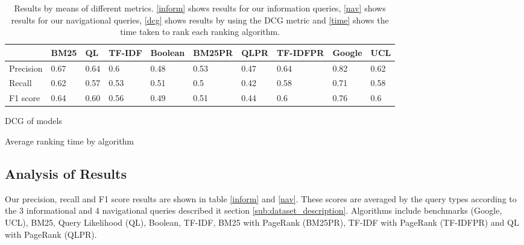 \begin{table*}[!t]
\begin{subtable}{.5\textwidth}
    \label{nav}
    \resizebox{\columnwidth}{!}
    {
      \begin{tabular}{|l|l|l|l|l|l|l|l|l|l|}
      \hline
                & BM25  & QL & TF-IDF &Boolean& BM25PR &QLPR&TF-IDFPR &Google&UCL \\ \hline
      Precision & 0.67& 0.64& 0.6 &0.48& 0.53 & 0.47 & 0.64&0.82&0.62 \\ \hline
      Recall    & 0.62& 0.57& 0.53& 0.51&0.5& 0.42& 0.58 &0.71&0.58\\ \hline
      F1 score  & 0.64& 0.60& 0.56& 0.49& 0.51&0.44 & 0.6&0.76&0.6\\ \hline
      \end{tabular}
    }
    \end{subtable}
    \begin{subtable}{.5\textwidth}
    \centering
    \caption{DCG of models}
    \label{dcg}
    \end{subtable}%
    \begin{subtable}{.5\textwidth}
    \centering
    \caption{Average ranking time by algorithm}
    \end{subtable}
    \caption{Results by means of different metrics. \ref{inform} shows results for our information queries, \ref{nav} shows results for our navigational queries, \ref{dcg} shows results by using the DCG metric and \ref{time} shows the time taken to rank each ranking algorithm.}
    \label{fig:results}
\end{table*}

\subsection{Analysis of Results} %
\label{sub:analysis_of_results}
Our precision, recall and F1 score results are shown in table \ref{inform} and \ref{nav}. These scores are averaged by the query types according to the 3 informational and 4 navigational queries described it section \ref{sub:dataset_description}. Algorithms include benchmarks (Google, UCL), BM25, Query Likelihood (QL), Boolean, TF-IDF, BM25 with PageRank (BM25PR), TF-IDF with PageRank (TF-IDFPR) and QL with PageRank (QLPR).

